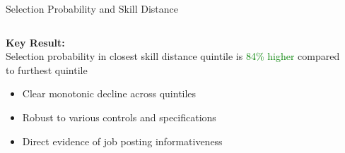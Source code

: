 \documentclass{beamer}
\begin{document}
\begin{frame}{Selection Probability and Skill Distance}
\begin{columns}
\begin{column}{0.45\textwidth}
\begin{tcolorbox}[colback=boxbackground,colframe=boxframe,sharp corners]
\textbf{Key Result:}\\
Selection probability in closest skill distance quintile is \textcolor{green}{84\% higher} compared to furthest quintile
\end{tcolorbox}

\begin{itemize}
    \item Clear monotonic decline across quintiles
    \item Robust to various controls and specifications
    \item Direct evidence of job posting informativeness
\end{itemize}
\end{column}
\begin{column}{0.55\textwidth}
\caption*{Selection Probability by Skill Distance Quintile}
\end{column}
\end{columns}
\end{frame}
\end{document}
